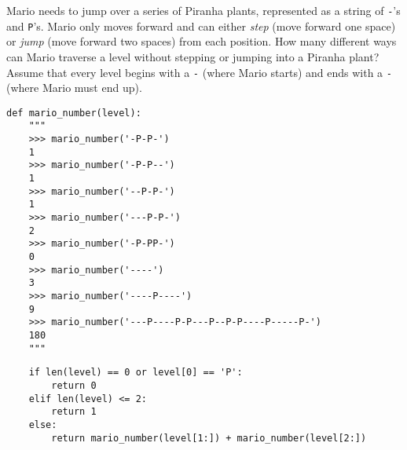 \begin{blocksection}
\question Mario needs to jump over a series of Piranha plants, represented as a
string of \lstinline$-$'s and \lstinline$P$'s. Mario only moves forward and can
either \emph{step} (move forward one space) or \emph{jump} (move forward two
spaces) from each position. How many different ways can Mario traverse a level
without stepping or jumping into a Piranha plant? Assume that every level begins
with a \lstinline$-$ (where Mario starts) and ends with a \lstinline$-$ (where
Mario must end up).

\begin{lstlisting}
def mario_number(level):
    """
    >>> mario_number('-P-P-')
    1
    >>> mario_number('-P-P--')
    1
    >>> mario_number('--P-P-')
    1
    >>> mario_number('---P-P-')
    2
    >>> mario_number('-P-PP-')
    0
    >>> mario_number('----')
    3
    >>> mario_number('----P----')
    9
    >>> mario_number('---P----P-P---P--P-P----P-----P-')
    180
    """
\end{lstlisting}

\begin{solution}[1in]
\begin{lstlisting}
    if len(level) == 0 or level[0] == 'P':
        return 0
    elif len(level) <= 2:
        return 1
    else:
        return mario_number(level[1:]) + mario_number(level[2:])
\end{lstlisting}
\end{solution}
\end{blocksection}
